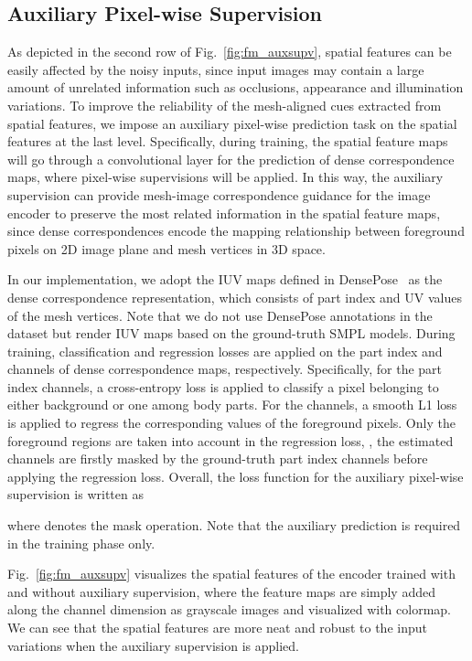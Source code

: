 \documentclass[10pt,twocolumn,letterpaper]{article}
\begin{document}
\subsection{Auxiliary Pixel-wise Supervision}
As depicted in the second row of Fig.~\ref{fig:fm_auxsupv}, spatial features can be easily affected by the noisy inputs, since input images may contain a large amount of unrelated information such as occlusions, appearance and illumination variations.
To improve the reliability of the mesh-aligned cues extracted from spatial features, we impose an auxiliary pixel-wise prediction task on the spatial features at the last level.
Specifically, during training, the spatial feature maps  will go through a convolutional layer for the prediction of dense correspondence maps, where pixel-wise supervisions will be applied.
In this way, the auxiliary supervision can provide mesh-image correspondence guidance for the image encoder to preserve the most related information in the spatial feature maps, since dense correspondences encode the mapping relationship between foreground pixels on 2D image plane and mesh vertices in 3D space.

In our implementation, we adopt the IUV maps defined in DensePose~\cite{alp2018densepose} as the dense correspondence representation, which consists of part index and UV values of the mesh vertices.
Note that we do not use DensePose annotations in the dataset but render IUV maps based on the ground-truth SMPL models.
During training, classification and regression losses are applied on the part index  and  channels of dense correspondence maps, respectively.
Specifically, for the part index  channels, a cross-entropy loss is applied to classify a pixel belonging to either background or one among body parts.
For the  channels, a smooth L1 loss is applied to regress the corresponding  values of the foreground pixels.
Only the foreground regions are taken into account in the  regression loss, \ie, the estimated  channels are firstly masked by the ground-truth part index channels before applying the regression loss.
Overall, the loss function for the auxiliary pixel-wise supervision is written as

where  denotes the mask operation.
Note that the auxiliary prediction is required in the training phase only.

Fig.~\ref{fig:fm_auxsupv} visualizes the spatial features of the encoder trained with and without auxiliary supervision, where the feature maps are simply added along the channel dimension as grayscale images and visualized with colormap.
We can see that the spatial features are more neat and robust to the input variations when the auxiliary supervision is applied.
\end{document}

